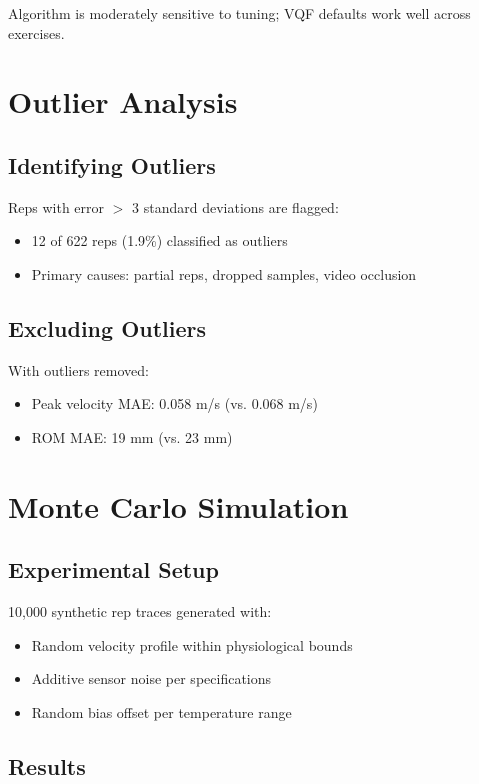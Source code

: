 Algorithm is moderately sensitive to tuning; VQF defaults work well across exercises.

\section{Outlier Analysis}

\subsection{Identifying Outliers}

Reps with error $>$ 3 standard deviations are flagged:

\begin{itemize}
    \item 12 of 622 reps (1.9\%) classified as outliers
    \item Primary causes: partial reps, dropped samples, video occlusion
\end{itemize}

\subsection{Excluding Outliers}

With outliers removed:
\begin{itemize}
    \item Peak velocity MAE: 0.058 m/s (vs. 0.068 m/s)
    \item ROM MAE: 19 mm (vs. 23 mm)
\end{itemize}

\section{Monte Carlo Simulation}

\subsection{Experimental Setup}

10,000 synthetic rep traces generated with:
\begin{itemize}
    \item Random velocity profile within physiological bounds
    \item Additive sensor noise per specifications
    \item Random bias offset per temperature range
\end{itemize}

\subsection{Results}

